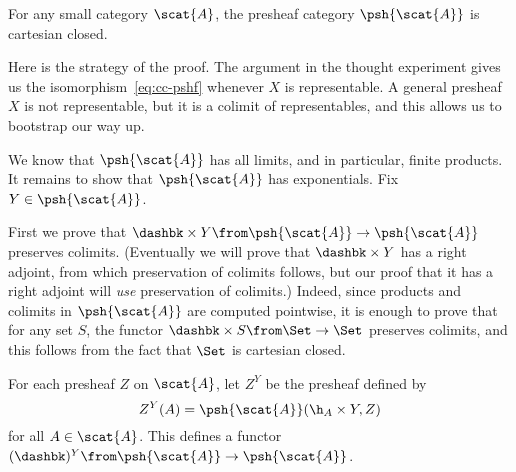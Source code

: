 \begin{thm}     
\label{thm:pshf-cc}
For any small category $\scat{A}$, the presheaf%
%
%
 category $\psh{\scat{A}}$
is cartesian closed.
\end{thm}
% 
Here is the strategy of the proof.  The argument in the thought experiment
gives us the isomorphism~\eqref{eq:cc-pshf} whenever $X$ is representable.
A general presheaf $X$ is not representable, but it is a colimit of
representables, and this allows us to bootstrap our way up.

\begin{pf}
We know that $\psh{\scat{A}}$ has all limits, and in particular, finite
products.  It remains to show that $\psh{\scat{A}}$ has exponentials.  Fix
$Y \in \psh{\scat{A}}$.

First we prove that $\dashbk \times Y\from \psh{\scat{A}} \to
\psh{\scat{A}}$ preserves colimits.  (Eventually we will prove that
$\dashbk\times Y$ has a right adjoint, from which preservation of colimits
follows, but our proof that it has a right adjoint will \emph{use}
preservation of colimits.)  Indeed, since products and colimits in
$\psh{\scat{A}}$ are computed pointwise, it is enough to prove that for any
set $S$, the functor $\dashbk \times S\from \Set \to \Set$ preserves
colimits, and this follows from the fact that $\Set$ is cartesian closed.

For each presheaf $Z$ on $\scat{A}$, let $Z^Y$ be the presheaf defined by
\[
Z^Y (A) = \psh{\scat{A}} (\h_A \times Y, Z)
\]
for all $A \in \scat{A}$.  This defines a functor $(\dashbk)^Y \from
\psh{\scat{A}} \to \psh{\scat{A}}$.  


\end{pf}
